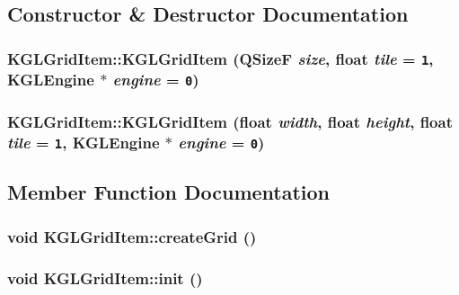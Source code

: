 \subsection{Constructor \& Destructor Documentation}
\hypertarget{class_k_g_l_grid_item_8016e40bc98d55adc2b08674d2fa117e}{
\subsubsection[{KGLGridItem}]{\setlength{\rightskip}{0pt plus 5cm}KGLGridItem::KGLGridItem (QSizeF {\em size}, \/  float {\em tile} = {\tt 1}, \/  {\bf KGLEngine} $\ast$ {\em engine} = {\tt 0})}}
\label{class_k_g_l_grid_item_8016e40bc98d55adc2b08674d2fa117e}


\hypertarget{class_k_g_l_grid_item_217588549e34d03495e0a883e3445c78}{
\subsubsection[{KGLGridItem}]{\setlength{\rightskip}{0pt plus 5cm}KGLGridItem::KGLGridItem (float {\em width}, \/  float {\em height}, \/  float {\em tile} = {\tt 1}, \/  {\bf KGLEngine} $\ast$ {\em engine} = {\tt 0})}}
\label{class_k_g_l_grid_item_217588549e34d03495e0a883e3445c78}




\subsection{Member Function Documentation}
\hypertarget{class_k_g_l_grid_item_4e80ff451f8c95bc540751ed8f2b9a76}{
\subsubsection[{createGrid}]{\setlength{\rightskip}{0pt plus 5cm}void KGLGridItem::createGrid ()}}
\label{class_k_g_l_grid_item_4e80ff451f8c95bc540751ed8f2b9a76}


\hypertarget{class_k_g_l_grid_item_b86b8c2552de5956e79abb6b0ce81d73}{
\subsubsection[{init}]{\setlength{\rightskip}{0pt plus 5cm}void KGLGridItem::init ()}}
\label{class_k_g_l_grid_item_b86b8c2552de5956e79abb6b0ce81d73}




